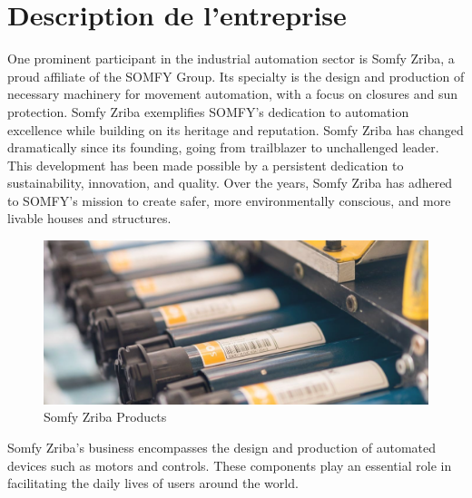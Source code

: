 \section{Description de l'entreprise}

One prominent participant in the industrial automation sector is Somfy Zriba, a proud affiliate of the SOMFY Group. Its specialty is the design and production of necessary machinery for movement automation, with a focus on closures and sun protection. Somfy Zriba exemplifies SOMFY's dedication to automation excellence while building on its heritage and reputation.
Somfy Zriba has changed dramatically since its founding, going from trailblazer to unchallenged leader. This development has been made possible by a persistent dedication to sustainability, innovation, and quality. Over the years, Somfy Zriba has adhered to SOMFY's mission to create safer, more environmentally conscious, and more livable houses and structures.
\begin{figure}[H]
    \centering
    \includegraphics[width=1\textwidth]{chapters/1/img/sitemmoto.png}
    \caption{Somfy Zriba Products}
    \label{fig:campus}
\end{figure}
Somfy Zriba's business encompasses the design and production of automated devices such as motors and controls. These components play an essential role in facilitating the daily lives of users around the world. 

